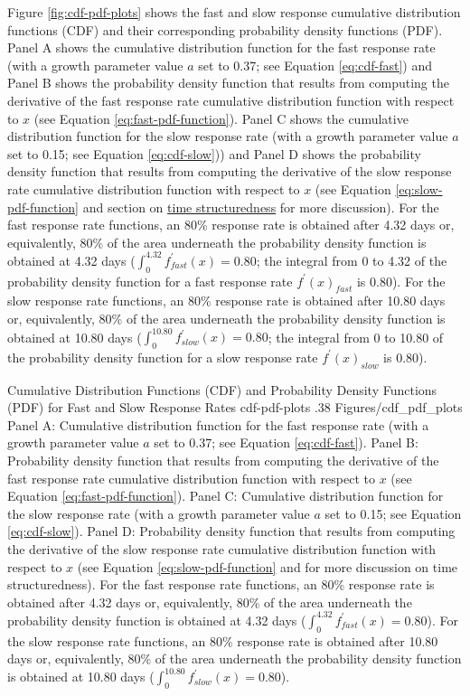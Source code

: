 \documentclass[
12pt, %
twoside,
english]{guelphthesis}
\begin{document}
Figure \ref{fig:cdf-pdf-plots} shows the fast and slow response
cumulative distribution functions (CDF) and their corresponding
probability density functions (PDF). Panel A shows the cumulative
distribution function for the fast response rate (with a growth
parameter value \(a\) set to 0.37; see Equation \ref{eq:cdf-fast}) and
Panel B shows the probability density function that results from
computing the derivative of the fast response rate cumulative
distribution function with respect to \(x\) (see Equation
\ref{eq:fast-pdf-function}). Panel C shows the cumulative distribution
function for the slow response rate (with a growth parameter value \(a\)
set to 0.15; see Equation \ref{eq:cdf-slow})) and Panel D shows the
probability density function that results from computing the derivative
of the slow response rate cumulative distribution function with respect
to \(x\) (see Equation \ref{eq:slow-pdf-function} and section on \protect\hyperlink{sec:time-structuredness}{time
structuredness} for more discussion). For the
fast response rate functions, an 80\% response rate is obtained after
4.32 days or, equivalently, 80\% of the area underneath the probability
density function is obtained at 4.32 days
(\(\int^{4.32}_{0} f_{fast}^\prime (x) = 0.80\); the integral from 0 to 4.32 of the probability density function for a fast response rate \(f^\prime(x)_{fast}\) is 0.80). For the slow response
rate functions, an 80\% response rate is obtained after 10.80 days or,
equivalently, 80\% of the area underneath the probability density
function is obtained at 10.80 days
(\(\int^{10.80}_{0} f_{slow}^\prime (x) = 0.80\); the integral from 0 to 10.80 of the probability density function for a slow response rate \(f^\prime(x)_{slow}\) is 0.80).
\begin{apaFigure}
[portrait]
[samepage]
[0cm]
{Cumulative Distribution Functions (CDF) and Probability Density Functions (PDF) for Fast and Slow Response Rates}
{cdf-pdf-plots}
{.38}
{Figures/cdf_pdf_plots}
{Panel A: Cumulative distribution function for the fast response rate (with a growth parameter value $a$ set to 0.37; see Equation \ref{eq:cdf-fast}). Panel B: Probability density function that results from computing the derivative of the fast response rate cumulative distribution function with respect to $x$ (see Equation \ref{eq:fast-pdf-function}). Panel C: Cumulative distribution function for the slow response rate (with a growth parameter value $a$ set to 0.15; see Equation \ref{eq:cdf-slow}). Panel D: Probability density function that results from computing the derivative of the slow response rate cumulative distribution function with respect to $x$ (see Equation \ref{eq:slow-pdf-function} and  for more discussion on time structuredness). For the fast response rate functions, an 80\% response rate is obtained after 4.32 days or, equivalently, 80\% of the area underneath the probability density function is obtained at 4.32 days ($\int^{4.32}_{0} f_{fast}^\prime (x) = 0.80$). For the slow response rate functions, an 80\% response rate is obtained after 10.80 days or, equivalently, 80\% of the area underneath the probability density function is obtained at 10.80 days ($\int^{10.80}_{0} f_{slow}^\prime (x) = 0.80$).}
\end{apaFigure}
\end{document}
